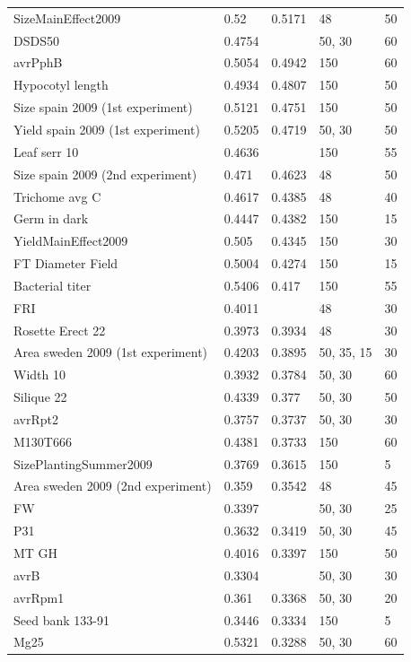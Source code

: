 \begin{longtable}{p{} p{} p{} p{} p{}}
 SizeMainEffect2009 & 0.52 & 0.5171 & 48 & 50 \\
 DSDS50 & 0.4754 & \color{red}{0.5006} & 50, 30 & 60 \\
 avrPphB & 0.5054 & 0.4942 & 150 & 60 \\
 Hypocotyl length & 0.4934 & 0.4807 & 150 & 50 \\
 Size spain 2009 (1st experiment) & 0.5121 & 0.4751 & 150 & 50 \\
 Yield spain 2009 (1st experiment) & 0.5205 & 0.4719 & 50, 30 & 50 \\
 Leaf serr 10 & 0.4636 & \color{red}{0.4683} & 150 & 55 \\
 Size spain 2009 (2nd experiment) & 0.471 & 0.4623 & 48 & 50 \\
 Trichome avg C & 0.4617 & 0.4385 & 48 & 40 \\
 Germ in dark & 0.4447 & 0.4382 & 150 & 15 \\
 YieldMainEffect2009 & 0.505 & 0.4345 & 150 & 30 \\
 FT Diameter Field & 0.5004 & 0.4274 & 150 & 15 \\
 Bacterial titer & 0.5406 & 0.417 & 150 & 55 \\
 FRI & 0.4011 & \color{red}{0.4119} & 48 & 30 \\
 Rosette Erect 22 & 0.3973 & 0.3934 & 48 & 30 \\
 Area sweden 2009 (1st experiment) & 0.4203 & 0.3895 & 50, 35, 15 & 30 \\
 Width 10 & 0.3932 & 0.3784 & 50, 30 & 60 \\
 Silique 22 & 0.4339 & 0.377 & 50, 30 & 50 \\
 avrRpt2 & 0.3757 & 0.3737 & 50, 30 & 30 \\
 M130T666 & 0.4381 & 0.3733 & 150 & 60 \\
 SizePlantingSummer2009 & 0.3769 & 0.3615 & 150 & 5 \\
 Area sweden 2009 (2nd experiment) & 0.359 & 0.3542 & 48 & 45 \\
 FW & 0.3397 & \color{red}{0.3522} & 50, 30 & 25 \\
 P31 & 0.3632 & 0.3419 & 50, 30 & 45 \\
 MT GH & 0.4016 & 0.3397 & 150 & 50 \\
 avrB & 0.3304 & \color{red}{0.3384} & 50, 30 & 30 \\
 avrRpm1 & 0.361 & 0.3368 & 50, 30 & 20 \\
 Seed bank 133-91 & 0.3446 & 0.3334 & 150 & 5 \\
 Mg25 & 0.5321 & 0.3288 & 50, 30 & 60 \\

\end{longtable}
